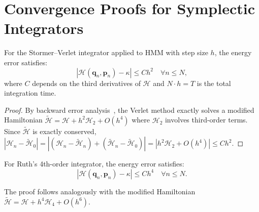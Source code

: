 \section{Convergence Proofs for Symplectic Integrators}

\label{app:convergence}

\begin{lemma}
For the Stormer--Verlet integrator applied to HMM with step size $h$, the energy error satisfies:
\begin{equation}
|\mathcal{H}(\bm{q}_n, \bm{p}_n) - \kappa| \le C h^2 \quad \forall n \le N,
\end{equation}
where $C$ depends on the third derivatives of $\mathcal{H}$ and $N \cdot h = T$ is the total integration time.
\end{lemma}

\begin{proof}
By backward error analysis~\cite{hairer2006geometric}, the Verlet method exactly solves a modified Hamiltonian $\tilde{\mathcal{H}} = \mathcal{H} + h^2\mathcal{H}_2 + O(h^4)$ where $\mathcal{H}_2$ involves third-order terms. Since $\tilde{\mathcal{H}}$ is exactly conserved, $|\mathcal{H}_n - \tilde{\mathcal{H}}_0| = |(\mathcal{H}_n - \tilde{\mathcal{H}}_n) + (\tilde{\mathcal{H}}_n - \tilde{\mathcal{H}}_0)| = |h^2\mathcal{H}_2 + O(h^4)| \le Ch^2$.
\end{proof}

\begin{lemma}
For Ruth's 4th-order integrator, the energy error satisfies:
\begin{equation}
|\mathcal{H}(\bm{q}_n, \bm{p}_n) - \kappa| \le C h^4 \quad \forall n \le N.
\end{equation}
\end{lemma}

The proof follows analogously with the modified Hamiltonian $\tilde{\mathcal{H}} = \mathcal{H} + h^4\mathcal{H}_4 + O(h^6)$.

